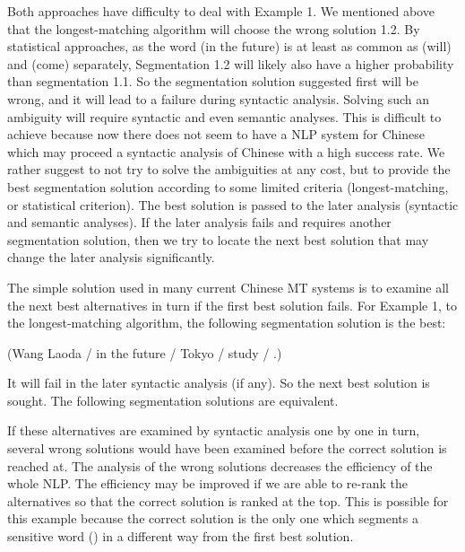 Both approaches have difficulty to deal with Example 1. We mentioned above that 
the longest-matching algorithm will choose the wrong solution 1.2. By statistical approaches, as the word   (in the future) is 
at least as common as   (will) and   (come) separately, Segmentation 1.2 will likely also have a higher probability 
than segmentation 1.1. So the segmentation solution suggested first will be wrong, and it will lead to a failure during 
syntactic analysis. Solving such an ambiguity will require syntactic and even semantic analyses. This is difficult to 
achieve because now there does not seem to have a NLP system for Chinese which may proceed a syntactic analysis of 
Chinese with a high success rate. We rather suggest to not try to solve the ambiguities at any cost, but to provide the 
best segmentation solution according to some limited criteria (longest-matching, or statistical criterion). The best 
solution is passed to the later analysis (syntactic and semantic analyses). If the later analysis fails and requires another 
segmentation solution, then we try to locate the next best solution that may change the later analysis significantly. 

The simple solution used in many current Chinese MT systems is to examine all the next best alternatives in turn if the first best 
solution fails. For Example 1, to the longest-matching algorithm, the following segmentation solution is the best:


(Wang Laoda / in the future / Tokyo / study / .)
\medskip

\noindent
It will fail in the later syntactic analysis (if any). So the next best solution is sought. The following segmentation 
solutions are equivalent.
\medskip









 If these alternatives are examined by syntactic analysis one by one in turn, several wrong solutions would have been 
examined before the correct solution is reached at. The analysis of the wrong solutions decreases the 
efficiency of the whole NLP. The efficiency may be improved if we are able to re-rank the alternatives so that the correct solution is ranked at the top. This is possible for this example because the correct solution is the only one which 
segments a sensitive word () in a different way from the first best solution.

